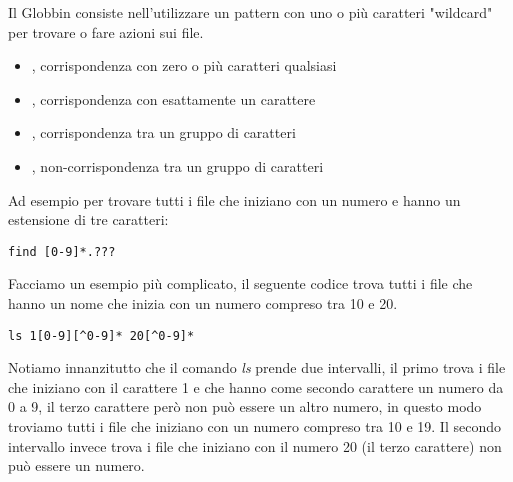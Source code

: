 \documentclass[../main.tex]{subfiles}
\begin{document}
Il Globbin consiste nell'utilizzare un pattern con uno o più caratteri "wildcard" per trovare o fare azioni sui file.
\begin{itemize}
    \item \code{*}, corrispondenza con zero o più caratteri qualsiasi
    \item {}, corrispondenza con esattamente un carattere
    \item {}, corrispondenza tra un gruppo di caratteri
    \item {}, non-corrispondenza tra un gruppo di caratteri
\end{itemize}

Ad esempio per trovare tutti i file che iniziano con un numero e hanno un estensione di tre caratteri:
\begin{lstlisting}[style=bash]
    find [0-9]*.???
\end{lstlisting}

Facciamo un esempio più complicato, il seguente codice trova tutti i file che hanno un nome che inizia con un numero compreso tra 10 e 20.
\begin{lstlisting}[style=bash]
    ls 1[0-9][^0-9]* 20[^0-9]*
\end{lstlisting}
Notiamo innanzitutto che il comando \textit{ls} prende due intervalli, il primo trova i file che iniziano con il carattere 1 e che hanno
come secondo carattere un numero da 0 a 9, il terzo carattere però non può essere un altro numero, in questo modo troviamo tutti i file
che iniziano con un numero compreso tra 10 e 19. Il secondo intervallo invece trova i file che iniziano con il numero 20 (il terzo carattere)
non può essere un numero.
\end{document}

